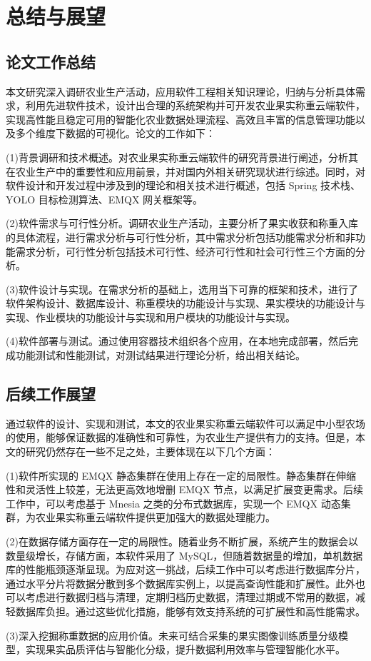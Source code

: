 \chapter{总结与展望}

\section{论文工作总结}

本文研究深入调研农业生产活动，应用软件工程相关知识理论，归纳与分析具体需求，利用先进软件技术，设计出合理的系统架构并可开发农业果实称重云端软件，实现高性能且稳定可用的智能化农业数据处理流程、高效且丰富的信息管理功能以及多个维度下数据的可视化。论文的工作如下：

(1)背景调研和技术概述。对农业果实称重云端软件的研究背景进行阐述，分析其在农业生产中的重要性和应用前景，并对国内外相关研究现状进行综述。同时，对软件设计和开发过程中涉及到的理论和相关技术进行概述，包括 Spring 技术栈、YOLO 目标检测算法、EMQX 网关框架等。

(2)软件需求与可行性分析。调研农业生产活动，主要分析了果实收获和称重入库的具体流程，进行需求分析与可行性分析，其中需求分析包括功能需求分析和非功能需求分析，可行性分析包括技术可行性、经济可行性和社会可行性三个方面的分析。

(3)软件设计与实现。在需求分析的基础上，选用当下可靠的框架和技术，进行了软件架构设计、数据库设计、称重模块的功能设计与实现、果实模块的功能设计与实现、作业模块的功能设计与实现和用户模块的功能设计与实现。

(4)软件部署与测试。通过使用容器技术组织各个应用，在本地完成部署，然后完成功能测试和性能测试，对测试结果进行理论分析，给出相关结论。

\section{后续工作展望}

通过软件的设计、实现和测试，本文的农业果实称重云端软件可以满足中小型农场的使用，能够保证数据的准确性和可靠性，为农业生产提供有力的支持。但是，本文的研究仍然存在一些不足之处，主要体现在以下几个方面：

(1)软件所实现的 EMQX 静态集群在使用上存在一定的局限性。静态集群在伸缩性和灵活性上较差，无法更高效地增删 EMQX 节点，以满足扩展变更需求。后续工作中，可以考虑基于 Mnesia 之类的分布式数据库，实现一个 EMQX 动态集群，为农业果实称重云端软件提供更加强大的数据处理能力。

(2)在数据存储方面存在一定的局限性。随着业务不断扩展，系统产生的数据会以数量级增长，存储方面，本软件采用了 MySQL，但随着数据量的增加，单机数据库的性能瓶颈逐渐显现。为应对这一挑战，后续工作中可以考虑进行数据库分片，通过水平分片将数据分散到多个数据库实例上，以提高查询性能和扩展性。此外也可以考虑进行数据归档与清理，定期归档历史数据，清理过期或不常用的数据，减轻数据库负担。通过这些优化措施，能够有效支持系统的可扩展性和高性能需求。

(3)深入挖掘称重数据的应用价值。未来可结合采集的果实图像训练质量分级模型，实现果实品质评估与智能化分级，提升数据利用效率与管理智能化水平。